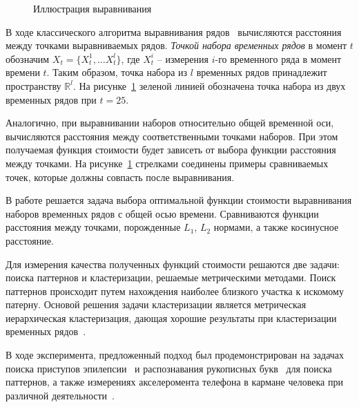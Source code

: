 \documentclass[12pt,twoside]{article}
\begin{document}
        \begin{figure}[h!]
            \centering
            {
               \fontsize{11pt}{1pt}\selectfont%
               \def\svgwidth{0.95\textwidth}
               
            }
            \caption{Иллюстрация выравнивания}\label{example}
        \end{figure}
        В ходе классического алгоритма выравнивания рядов~\cite{??} вычисляются расстояния между точками выравниваемых рядов. \textit{Точкой набора временных рядов} в момент $t$ обозначим $X_t = \{X^1_t,\dots X^l_t\}$, где $X^i_t$ \--- измерения $i$\--го временного ряда в момент времени $t$. Таким образом, точка набора из $l$ временных рядов принадлежит пространству $\mathbb{R}^{l}$.  На рисунке~\ref{example} зеленой линией обозначена точка набора из двух временных рядов при $t=25$.
        
        Аналогично, при выравнивании наборов относительно общей временной оси, вычисляются расстояния между соответственными точками наборов. При этом получаемая функция стоимости будет зависеть от выбора функции расстояния между точками. На рисунке~\ref{example} стрелками соединены примеры сравниваемых точек, которые должны совпасть после выравнивания.

        В работе решается задача выбора оптимальной функции стоимости выравнивания наборов временных рядов с общей осью времени. Сравниваются функции расстояния между точками, порожденные $L_1$, $L_2$ нормами, а также косинусное расстояние.
        
        Для измерения качества полученных функций стоимости решаются две задачи: поиска паттернов и кластеризации, решаемые метрическими методами. Поиск паттернов происходит путем нахождения наиболее близкого участка к искомому патерну. Основой решения задачи кластеризации является метрическая иерархическая кластеризация, дающая хорошие результаты при кластеризации временных рядов~\cite{WARRENLIAO20051857,AGHABOZORGI201516}.
        
        В ходе эксперимента, предложенный подход был продемонстрирован на задачах поиска приступов эпилепсии~\cite{epi} и распознавания рукописных букв~\cite{characters} для поиска паттернов, а также измерениях акселеромента телефона в кармане человека при различной деятельности~\cite{Kwapisz:2011:ARU:1964897.1964918}.  
        
        
\end{document}
